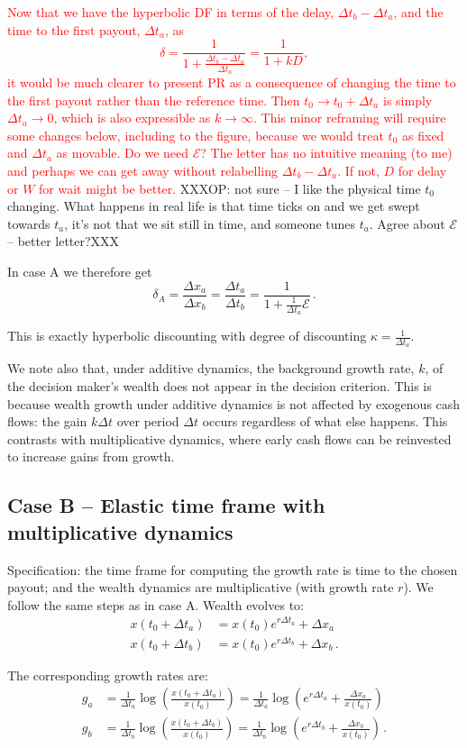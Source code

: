 \documentclass[11pt]{article}
\newcommand{\be}{\begin{equation}}
\newcommand{\ee}{\end{equation}}
\newcommand{\bea}{\begin{eqnarray}}
\newcommand{\eea}{\end{eqnarray}}
\newcommand{\Dt}{\Delta t}
\newcommand{\Dx}{\Delta x}
\newcommand{\Epsilon}{\mathcal{E}}
\numberwithin{equation}{section}
\begin{document}
\textcolor{red}{
Now that we have the hyperbolic DF in terms of the delay, $\Dt_b-\Dt_a$, and the time to the first payout, $\Dt_a$, as
\be
\delta = \frac{1}{1+\frac{\Dt_b-\Dt_a}{\Dt_a}} = \frac{1}{1+kD},
\ee
it would be much clearer to present PR as a consequence of changing the time to the first payout rather than the reference time. Then $t_0\to t_0+\Dt_a$ is simply $\Dt_a\to0$, which is also expressible as $k\to\infty$. This minor reframing will require some changes below, including to the figure, because we would treat $t_0$ as fixed and $\Dt_a$ as movable.
}
\textcolor{red}{
Do we need $\Epsilon$? The letter has no intuitive meaning (to me) and perhaps we can get away without relabelling $\Dt_b-\Dt_a$. If not, $D$ for delay or $W$ for wait might be better.
}
XXXOP: not sure -- I like the physical time $t_0$ changing. What happens in real life is that time ticks on and we get swept towards $t_a$, it's not that we sit still in time, and someone tunes $t_a$. Agree about $\Epsilon$ -- better letter?XXX


In case A we therefore get
\be
\delta_A = \frac{\Dx_a}{\Dx_b} = \frac{\Dt_a}{\Dt_b} = \frac{1}{1+\frac{1}{\Dt_a} \Epsilon}\,.
\ee

This is exactly hyperbolic discounting with degree of discounting $\kappa = \frac{1}{\Dt_a}$.

We note also that, under additive dynamics, the background growth rate, $k$, of the decision maker's wealth does not appear in the decision criterion. This is because wealth growth under additive dynamics is not affected by exogenous cash flows: the gain $k\Dt$ over period $\Dt$ occurs regardless of what else happens. This contrasts with multiplicative dynamics, where early cash flows can be reinvested to increase gains from growth.

\subsection{Case B -- Elastic time frame with multiplicative dynamics}\label{sec:case_B}

Specification: the time frame for computing the growth rate is time to the chosen payout; and the wealth dynamics are multiplicative (with growth rate $r$). We follow the same steps as in case A. Wealth evolves to:
\bea
x\left(t_0+\Dt_a\right) &= x\left(t_0\right) e^{r \Dt_a} + \Dx_a\\
x\left(t_0+\Dt_b\right) &= x\left(t_0\right) e^{r \Dt_b} + \Dx_b\,.
\eea

The corresponding growth rates are:
\bea
g_a &= \frac{1}{\Dt_a} \log{\left(\frac{x\left(t_0+\Dt_a\right)}{x\left(t_0\right)}\right)} = \frac{1}{\Dt_a}\log{\left(e^{r \Dt_a} + \frac{\Dx_a}{x\left(t_0\right)}\right)}\\
g_b &= \frac{1}{\Dt_b} \log{\left(\frac{x\left(t_0+\Dt_b\right)}{x\left(t_0\right)}\right)} = \frac{1}{\Dt_b}\log{\left(e^{r \Dt_b} + \frac{\Dx_b}{x\left(t_0\right)}\right)}\,.
\eea
\end{document}
